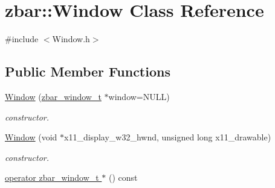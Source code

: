 \hypertarget{classzbar_1_1_window}{
\section{zbar::Window Class Reference}
\label{classzbar_1_1_window}
}


{\ttfamily \#include $<$Window.h$>$}

\subsection*{Public Member Functions}
\begin{DoxyCompactItemize}
\item 
\hypertarget{classzbar_1_1_window_ad80dfca737ffd81dacd015bad6ca643d}{
\hyperlink{classzbar_1_1_window_ad80dfca737ffd81dacd015bad6ca643d}{Window} (\hyperlink{zbar_8h_a724fee3a176ad764e8ee00aba116f36b}{zbar\_\-window\_\-t} $\ast$window=NULL)}
\label{classzbar_1_1_window_ad80dfca737ffd81dacd015bad6ca643d}

\begin{DoxyCompactList}\small\item\em constructor. \end{DoxyCompactList}\item 
\hypertarget{classzbar_1_1_window_a4d8fbb875d19ecd95f8468d0c5afea59}{
\hyperlink{classzbar_1_1_window_a4d8fbb875d19ecd95f8468d0c5afea59}{Window} (void $\ast$x11\_\-display\_\-w32\_\-hwnd, unsigned long x11\_\-drawable)}
\label{classzbar_1_1_window_a4d8fbb875d19ecd95f8468d0c5afea59}

\begin{DoxyCompactList}\small\item\em constructor. \end{DoxyCompactList}\item 
\hypertarget{classzbar_1_1_window_aa90d211a06ea64f846dcc1a8f1a21440}{
\hyperlink{classzbar_1_1_window_aa90d211a06ea64f846dcc1a8f1a21440}{operator zbar\_\-window\_\-t $\ast$} () const }
\label{classzbar_1_1_window_aa90d211a06ea64f846dcc1a8f1a21440}


\end{DoxyCompactItemize}
